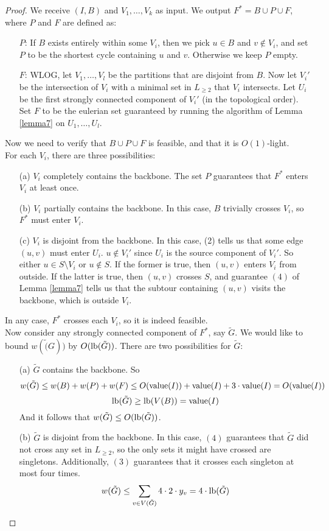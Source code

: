 \documentclass[./main.tex]{subfiles}
\begin{document}
\begin{proof}
We receive $(I,B)$ and $V_1,\ldots,V_k$ as input. We output $F^*=B\cup P\cup F$, where $P$ and $F$ are defined as:
\begin{enumerate}
\item[$P$:] If $B$ exists entirely within some $V_i$, then we pick $u\in B$ and $v\notin V_i$, and set $P$ to be the shortest cycle containing $u$ and $v$. Otherwise we keep $P$ empty.
\item[$F$:] WLOG, let $V_1,\ldots,V_l$ be the partitions that are disjoint from $B$. Now let $V_i'$ be the intersection of $V_i$ with a minimal set in $L_{\geq 2}$ that $V_i$ intersects. Let $U_i$ be the first strongly connected component of $V_i'$ (in the topological order). Set $F$ to be the eulerian set guaranteed by running the algorithm of Lemma \ref{lemma7} on $U_1,\ldots,U_l$.
\end{enumerate}\vspace{2mm}
Now we need to verify that $B\cup P\cup F$ is feasible, and that it is $O(1)$-light.
\\For each $V_i$, there are three possibilities:
\begin{enumerate}
\item[(a)] $V_i$ completely contains the backbone. The set $P$ guarantees that $F^*$ enters $V_i$ at least once.
\item[(b)] $V_i$ partially contains the backbone. In this case, $B$ trivially crosses $V_i$, so $F^*$ must enter $V_i$.
\item[(c)] $V_i$ is disjoint from the backbone. In this case, (2) tells us that some edge $(u,v)$ must enter $U_i$. $u\notin V_i'$ since $U_i$ is the source component of $V_i'$. So either $u\in S\setminus V_i$ or $u\notin S$. If the former is true, then $(u,v)$ enters $V_i$ from outside. If the latter is true, then $(u,v)$ crosses $S$, and guarantee $(4)$ of Lemma \ref{lemma7} tells us that the subtour containing $(u,v)$ visits the backbone, which is outside $V_i$.
\end{enumerate}
In any case, $F^*$ crosses each $V_i$, so it is indeed feasible.\vspace{2mm}
\\Now consider any strongly connected component of $F^*$, say $\tilde{G}$. We would like to bound $w(\tilde(G))$ by $O(\textup{lb}(\tilde{G}))$. There are two possibilities for $\tilde{G}$:
\begin{enumerate}
\item[(a)] $\tilde{G}$ contains the backbone. So $$w(\tilde{G})\leq w(B) + w(P) + w(F)\leq O(\textup{value}(I)) + \textup{value}(I) + 3\cdot\textup{value}(I) = O(\textup{value}(I))$$
$$\textup{lb}(\tilde{G})\geq \textup{lb}(V(B)) = \textup{value}(I)$$
And it follows that $w(\tilde{G})\leq O(\textup{lb}(\tilde{G}))$.
\item[(b)] $\tilde{G}$ is disjoint from the backbone. In this case, $(4)$ guarantees that $\tilde{G}$ did not cross any set in $L_{\geq 2}$, so the only sets it might have crossed are singletons. Additionally, $(3)$ guarantees that it crosses each singleton at most four times. $$w(\tilde{G})\leq \sum_{v\in V(\tilde{G})}4\cdot 2\cdot y_v = 4\cdot\textup{lb}(\tilde{G})$$
\end{enumerate}
\end{proof}
\end{document}
